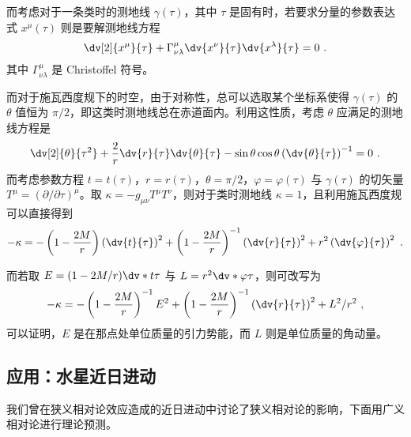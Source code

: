 而考虑对于一条类时的测地线 $\gamma(\tau)$，其中 $\tau$ 是固有时，若要求分量的参数表达式 $x^\mu(\tau)$ 则是要解测地线方程
\begin{equation}
\dv[2]{x^\mu}{\tau} + \Gamma^{\mu}_{\nu \lambda} \dv{x^\nu}{\tau} \dv{x^\lambda}{\tau} = 0~.
\end{equation}
其中 $\Gamma^\mu_{\nu \lambda}$ 是 Christoffel 符号。

而对于施瓦西度规下的时空，由于对称性，总可以选取某个坐标系使得 $\gamma(\tau)$ 的 $\theta$ 值恒为 $\pi/2$，即这类时测地线总在赤道面内。利用这性质，考虑 $\theta$ 应满足的测地线方程是
\begin{equation}
\dv[2]{\theta}{\tau^2} + \frac{2}{r} \dv{r}{\tau} \dv{\theta}{\tau} - \sin \theta \cos \theta \left(\dv{\theta}{\tau}\right)^{-1} = 0 ~.
\end{equation}
而考虑参数方程 $t = t(\tau)$，$r = r(\tau)$，$\theta = \pi/2$，$\varphi = \varphi(\tau)$ 与 $\gamma(\tau)$ 的切矢量 $T^\mu = (\partial/\partial \tau)^\mu$。取 $\kappa = -g_{\mu\nu} T^\mu T^\nu$，则对于类时测地线 $\kappa = 1$，且利用施瓦西度规可以直接得到
\begin{equation}
-\kappa = -\left(1 - \frac{2M}{r}\right)\left(\dv{t}{\tau}\right)^2 + \left(1-\frac{2M}{r}\right)^{-1} \left(\dv{r}{\tau}\right)^2 + r^2 \left(\dv{\varphi}{\tau}\right)^2 ~.
\end{equation}

而若取 $E = (1-2M/r) \dv*{t}{\tau}$ 与 $L = r^2 \dv*{\varphi}{\tau}$，则可改写为
\begin{equation}
-\kappa = -\left(1-\frac{2M}{r}\right)^{-1} E^2  + \left(1-\frac{2M}{r}\right)^{-1} \left(\dv{r}{\tau}\right)^2 + L^2/r^2 ~,
\end{equation}
可以证明，$E$ 是在那点处单位质量的引力势能，而 $L$ 则是单位质量的角动量。

\subsection{应用：水星近日进动}\label{sub_grScGe_1}
我们曾在狭义相对论效应造成的近日进动中讨论了狭义相对论的影响，下面用广义相对论进行理论预测。

